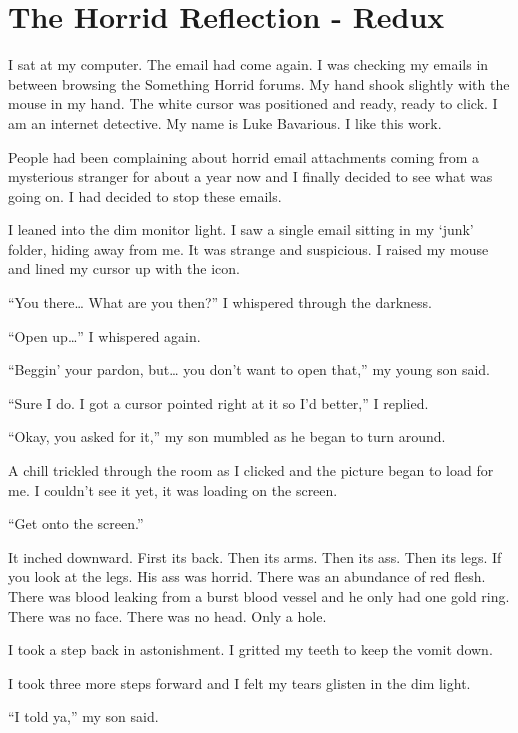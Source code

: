 \chapter{The Horrid Reflection - Redux}





I sat at my computer. The email had come again. I was checking my
emails in between browsing the Something Horrid forums. My hand
shook slightly with the mouse in my hand. The white cursor was
positioned and ready, ready to click. I am an internet detective.
My name is Luke Bavarious. I like this work.

People had been complaining about horrid email attachments coming
from a mysterious stranger for about a year now and I finally
decided to see what was going on. I had decided to stop these
emails.

I leaned into the dim monitor light. I saw a single email sitting
in my `junk' folder, hiding away from me. It was
strange and suspicious. I raised my mouse and lined my cursor up
with the icon.

``You there{\ldots} What are you then?'' I whispered through the
darkness.

``Open up{\ldots}'' I whispered again.

``Beggin' your pardon, but{\ldots} you don't want to open that,'' my young
son said.

``Sure I do. I got a cursor pointed right at it so I'd
better,'' I replied.

``Okay, you asked for it,'' my son mumbled as he began to turn
around.

A chill trickled through the room as I clicked and the picture
began to load for me. I couldn't see it yet, it was loading on the
screen.

``Get onto the screen.''

It inched downward. First its back. Then its arms. Then its ass.
Then its legs. If you look at the legs. His ass was horrid. There
was an abundance of red flesh. There was blood leaking from a burst
blood vessel and he only had one gold ring. There was no face.
There was no head. Only a hole.

I took a step back in astonishment. I gritted my teeth to keep the
vomit down.

I took three more steps forward and I felt my tears glisten in the
dim light.

``I told ya,'' my son said.

